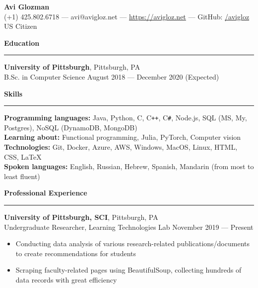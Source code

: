 \documentclass[11pt]{article}
\begin{document}
	\pagestyle{empty}
	\begin{center}
		{\LARGE \textbf{Avi Glozman}}\\
		\vspace{1.25mm}
		{\large (+1) 425.802.6718 --- avi@avigloz.net --- \href{https://avigloz.net}{https://avigloz.net} --- GitHub: \href{https://github.com/avigloz}{/avigloz}}\\
		\vspace{1mm}
		US Citizen
	\end{center}
	
	\begin{flushleft}
		
		\vspace{-1.65mm}
		{\large \raggedright \textbf{Education}}
		\vspace{1.25mm}
	
		\hrule
	
		\vspace{2.25mm}
		\textbf{University of Pittsburgh}, Pittsburgh, PA\\
		{\small B.Sc. in Computer Science \hfill August 2018 --- December 2020 (Expected)}
	
		\vspace{1.5mm}
		{\large \raggedright \textbf{Skills}}
		\vspace{1.25mm}
	
		\hrule
	
		\vspace{2.25mm}
		\textbf{Programming languages:} Java, Python, C, C\texttt{++}, C\verb!#!, Node.js, SQL (MS, My, Postgres), NoSQL (DynamoDB, MongoDB)\\
		\textbf{Learning about:} Functional programming, Julia, PyTorch, Computer vision\\
		\textbf{Technologies:} Git, Docker, Azure, AWS, Windows, MacOS, Linux, HTML, CSS, \LaTeX\\
		\textbf{Spoken languages:} English, Russian, Hebrew, Spanish, Mandarin (from most to least fluent)
		
		\vspace{1.35mm}
		{\large \raggedright \textbf{Professional Experience}}
		\vspace{1.25mm}
	
		\hrule

		\vspace{2.25mm}
		\textbf{University of Pittsburgh, SCI}, Pittsburgh, PA\\
		{\small Undergraduate Researcher, Learning Technologies Lab \hfill November 2019 --- Present}
		\vspace{-1.25mm}
		\begin{itemize}
				\item Conducting data analysis of various research-related publications/documents to create recommendations for students
				\vspace{-1.5mm}
				\item Scraping faculty-related pages using BeautifulSoup, collecting hundreds of data records with great efficiency
				\vspace{-1.5mm}
		\end{itemize}


\end{flushleft}
\end{document}
